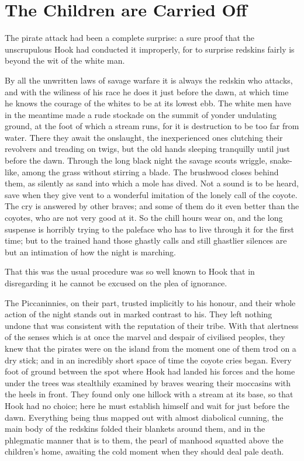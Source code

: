 
\chapter{The Children are Carried Off}

The pirate attack had been a complete surprise:
a sure proof that the unscrupulous Hook had conducted it improperly,
for to surprise redskins fairly is beyond the wit of the white man.

By all the unwritten laws of savage warfare it is always the redskin who attacks,
and with the wiliness of his race he does it just before the dawn,
at which time he knows the courage of the whites to be at its lowest ebb.
The white men have in the meantime made a rude stockade on the summit of yonder undulating ground,
at the foot of which a stream runs, for it is destruction to be too far from water.
There they await the onslaught,
the inexperienced ones clutching their revolvers and treading on twigs,
but the old hands sleeping tranquilly until just before the dawn.
Through the long black night the savage scouts wriggle, snake-like, among the grass without stirring a blade.
The brushwood closes behind them, as silently as sand into which a mole has dived.
Not a sound is to be heard, save when they give vent to a wonderful imitation of the lonely call of the coyote.
The cry is answered by other braves;
and some of them do it even better than the coyotes, who are not very good at it.
So the chill hours wear on,
and the long suspense is horribly trying to the paleface who has to live through it for the first time;
but to the trained hand those ghastly calls and still ghastlier silences
are but an intimation of how the night is marching.

That this was the usual procedure was so well known to Hook
that in disregarding it he cannot be excused on the plea of ignorance.

The Piccaninnies, on their part, trusted implicitly to his honour,
and their whole action of the night stands out in marked contrast to his.
They left nothing undone that was consistent with the reputation of their tribe.
With that alertness of the senses which is at once the marvel and despair of civilised peoples,
they knew that the pirates were on the island from the moment one of them trod on a dry stick;
and in an incredibly short space of time the coyote cries began.
Every foot of ground between the spot where Hook had landed his forces and the home under the trees
was stealthily examined by braves wearing their moccasins with the heels in front.
They found only one hillock with a stream at its base, so that Hook had no choice;
here he must establish himself and wait for just before the dawn.
Everything being thus mapped out with almost diabolical cunning,
the main body of the redskins folded their blankets around them,
and in the phlegmatic manner that is to them, the pearl of manhood squatted above the children’s home,
awaiting the cold moment when they should deal pale death.

